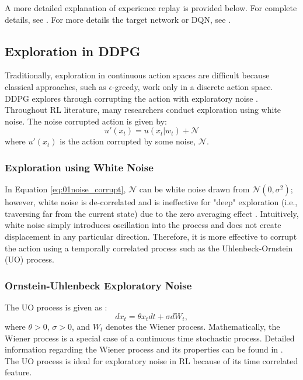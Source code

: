 A more detailed explanation of experience replay is provided below.  For complete details, see \cite{exp_replay, p_exp}. For more details the target network or DQN, see \cite{dqn1, dqn2}.  

\subsection{Exploration in DDPG}
Traditionally, exploration in continuous action spaces are difficult because classical approaches, such as $\epsilon$-greedy, work only in a discrete action space.  DDPG explores through corrupting the action with exploratory noise \cite{ddpg}.  Throughout RL literature, many researchers conduct exploration using white noise. The noise corrupted action is given by:
\begin{equation}
    u'(x_t) = u(x_t|w_t) + \mathcal{N}
    \label{eq:01noise_corrupt}
\end{equation}
where $u'(x_t)$ is the action corrupted by some noise, $\mathcal{N}$.

\subsubsection{Exploration using White Noise}
In Equation \ref{eq:01noise_corrupt}, $\mathcal{N}$ can be white noise drawn from $\mathcal{N}(0, \sigma^2)$; however, white noise is de-correlated and is ineffective for "deep" exploration (i.e., traversing far from the current state) due to the zero averaging effect \cite{white_noise}. Intuitively, white noise simply introduces oscillation into the process and does not create displacement in any particular direction. Therefore, it is more effective to corrupt the action using a temporally correlated process such as the Uhlenbeck-Ornstein (UO) process.

\subsubsection{Ornstein-Uhlenbeck Exploratory Noise}

The UO process is given as \cite{ornstein}:
\begin{equation}
    dx_t = \theta x_t dt + \sigma dW_t,
    \label{eq:01OU}
\end{equation}
where $\theta > 0$, $\sigma > 0$, and $W_t$ denotes the Wiener process. Mathematically, the Wiener process is a special case of a continuous time stochastic process. Detailed information regarding the Wiener process and its properties can be found in \cite{wiener}. The UO process is ideal for exploratory noise in RL because of its time correlated feature.


